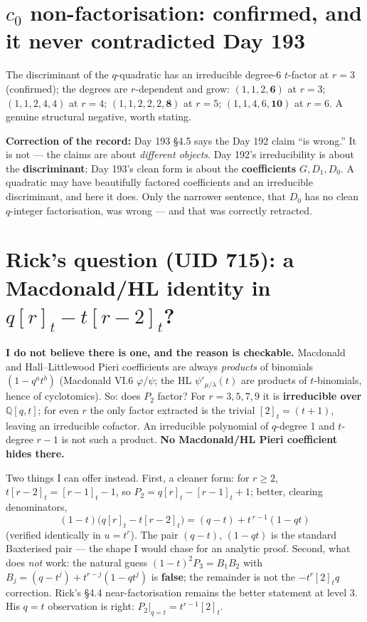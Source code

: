 \documentclass[11pt,a4paper]{article}
\begin{document}
\section{$c_0$ non-factorisation: confirmed, and it never contradicted Day 193}
The discriminant of the $q$-quadratic has an irreducible degree-6 $t$-factor at
$r=3$ (confirmed); the degrees are $r$-dependent and grow: $(1,1,2,\mathbf 6)$ at
$r=3$; $(1,1,2,4,4)$ at $r=4$; $(1,1,2,2,2,\mathbf 8)$ at $r=5$;
$(1,1,4,6,\mathbf{10})$ at $r=6$. A genuine structural negative, worth stating.

\noindent\textbf{Correction of the record:} Day 193 \S4.5 says the Day 192 claim ``is
wrong.'' It is not --- the claims are about \emph{different objects}. Day 192's
irreducibility is about the \textbf{discriminant}; Day 193's clean form is about the
\textbf{coefficients} $G,D_1,D_0$. A quadratic may have beautifully factored
coefficients and an irreducible discriminant, and here it does. Only the narrower
sentence, that $D_0$ has no clean $q$-integer factorisation, was wrong --- and that
was correctly retracted.

\section{Rick's question (UID 715): a Macdonald/HL identity in $q[r]_t-t[r-2]_t$?}
\textbf{I do not believe there is one, and the reason is checkable.} Macdonald and
Hall--Littlewood Pieri coefficients are always \emph{products} of binomials
$(1-q^at^b)$ (Macdonald VI.6 $\varphi/\psi$; the HL $\psi'_{\mu/\lambda}(t)$ are
products of $t$-binomials, hence of cyclotomics). So: does $P_2$ factor?
For $r=3,5,7,9$ it is \textbf{irreducible over $\mathbb Q[q,t]$}; for even $r$ the only
factor extracted is the trivial $[2]_t=(t+1)$, leaving an irreducible cofactor. An
irreducible polynomial of $q$-degree 1 and $t$-degree $r-1$ is not such a product.
\textbf{No Macdonald/HL Pieri coefficient hides there.}

Two things I can offer instead. First, a cleaner form: for $r\ge2$,
$t[r-2]_t=[r-1]_t-1$, so $P_2=q[r]_t-[r-1]_t+1$; better, clearing denominators,
\[\boxed{\;(1-t)\bigl(q[r]_t-t[r-2]_t\bigr)=(q-t)+t^{\,r-1}(1-qt)\;}\]
(verified identically in $u=t^r$). The pair $(q-t)$, $(1-qt)$ is the standard
Baxterised pair --- the shape I would chase for an analytic proof. Second, what does
\emph{not} work: the natural guess $(1-t)^2P_3=B_1B_2$ with
$B_j=(q-t^j)+t^{r-j}(1-qt^j)$ is \textbf{false}; the remainder is not the $-t^r[2]_tq$
correction. Rick's \S4.4 near-factorisation remains the better statement at level 3.
His $q=t$ observation is right: $P_2|_{q=t}=t^{r-1}[2]_t$.
\end{document}
